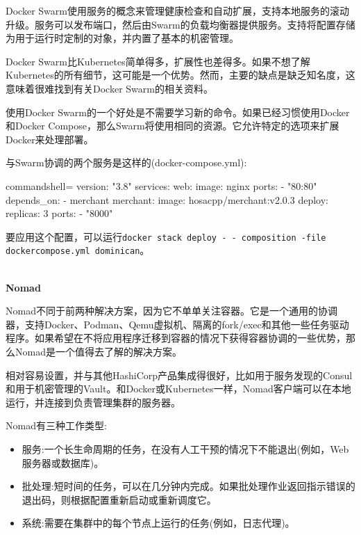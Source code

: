 Docker Swarm使用服务的概念来管理健康检查和自动扩展，支持本地服务的滚动升级。服务可以发布端口，然后由Swarm的负载均衡器提供服务。支持将配置存储为用于运行时定制的对象，并内置了基本的机密管理。

Docker Swarm比Kubernetes简单得多，扩展性也差得多。如果不想了解Kubernetes的所有细节，这可能是一个优势。然而，主要的缺点是缺乏知名度，这意味着很难找到有关Docker Swarm的相关资料。

使用Docker Swarm的一个好处是不需要学习新的命令。如果已经习惯使用Docker和Docker Compose，那么Swarm将使用相同的资源。它允许特定的选项来扩展Docker来处理部署。

与Swarm协调的两个服务是这样的(docker-compose.yml):

\begin{tcblisting}{commandshell={}}
version: "3.8"
services:
  web:
    image: nginx
    ports:
      - "80:80"
    depends_on:
      - merchant
  merchant:
    image: hosacpp/merchant:v2.0.3
    deploy:
      replicas: 3
    ports:
      - "8000"
\end{tcblisting}

要应用这个配置，可以运行\texttt{docker stack deploy -\,- composition -file dockercompose.yml dominican}。

\hspace*{\fill} \\ %
\noindent
\textbf{Nomad}

Nomad不同于前两种解决方案，因为它不单单关注容器。它是一个通用的协调器，支持Docker、Podman、Qemu虚拟机、隔离的fork/exec和其他一些任务驱动程序。如果希望在不将应用程序迁移到容器的情况下获得容器协调的一些优势，那么Nomad是一个值得去了解的解决方案。

相对容易设置，并与其他HashiCorp产品集成得很好，比如用于服务发现的Consul和用于机密管理的Vault。和Docker或Kubernetes一样，Nomad客户端可以在本地运行，并连接到负责管理集群的服务器。

Nomad有三种工作类型:

\begin{itemize}
\item 
服务:一个长生命周期的任务，在没有人工干预的情况下不能退出(例如，Web服务器或数据库)。

\item 
批处理:短时间的任务，可以在几分钟内完成。如果批处理作业返回指示错误的退出码，则根据配置重新启动或重新调度它。

\item 
系统:需要在集群中的每个节点上运行的任务(例如，日志代理)。
\end{itemize}

